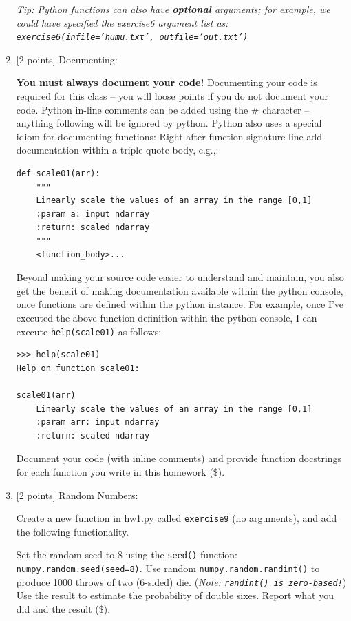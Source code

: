 \documentclass[10pt]{article}
\begin{document}
\begin{enumerate}
{\em Tip: Python functions can also have {\bf optional} arguments; for example, we could have specified the exercise6 argument list as: {\tt exercise6(infile='humu.txt', outfile='out.txt')}}



\item \label{prob:8} [2 points]
Documenting:

{\bf You must always document your code!}  Documenting your code is {\color{red} required} for this class -- you will loose points if you do not document your code.  Python in-line comments can be added using the \# character -- anything following will be ignored by python.  Python also uses a special idiom for documenting functions: Right after function signature line add documentation within a triple-quote body, e.g.,:
\begin{verbatim}
def scale01(arr):
    """
    Linearly scale the values of an array in the range [0,1]
    :param a: input ndarray
    :return: scaled ndarray
    """
    <function_body>...
\end{verbatim}
Beyond making your source code easier to understand and maintain, you also get the benefit of making documentation available within the python console, once functions are defined within the python instance.  For example, once I've executed the above function definition within the python console, I can execute {\tt help(scale01)} as follows:
\begin{verbatim}
>>> help(scale01)
Help on function scale01:

scale01(arr)
    Linearly scale the values of an array in the range [0,1]
    :param arr: input ndarray
    :return: scaled ndarray
\end{verbatim}

Document your code (with inline comments) and provide function docstrings for each function you write in this homework (\$).



\item \label{prob:9} [2 points]
Random Numbers:

Create a new function in hw1.py called {\tt exercise9} (no arguments), and add the following functionality.

Set the random seed to 8 using the {\tt seed()} function: {\tt numpy.random.seed(seed=8)}.  Use random {\tt numpy.random.randint()} to produce 1000 throws of two (6-sided) die.  ({\em Note: {\tt randint() is zero-based!}})  Use the result to estimate the probability of double sixes.  Report what you did and the result (\$).  


\end{enumerate}
\end{document}
